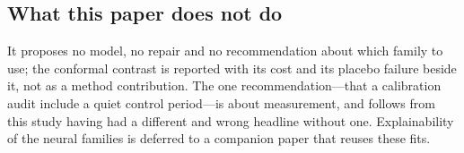 \subsection{What this paper does not do}

It proposes no model, no repair and no recommendation about which family to
use; the conformal contrast is reported with its cost and its placebo failure
beside it, not as a method contribution. The one recommendation---that a
calibration audit include a quiet control period---is about measurement, and
follows from this study having had a different and wrong headline without one.
Explainability of the neural families is deferred to a companion paper that
reuses these fits.
